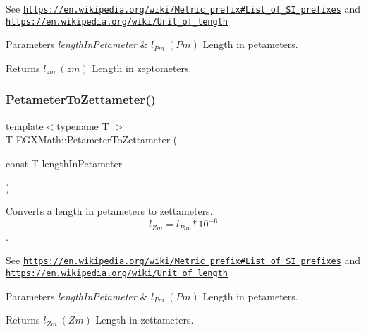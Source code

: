 See \href{https://en.wikipedia.org/wiki/Metric_prefix#List_of_SI_prefixes}{\tt https\+://en.\+wikipedia.\+org/wiki/\+Metric\+\_\+prefix\#\+List\+\_\+of\+\_\+\+S\+I\+\_\+prefixes} and \href{https://en.wikipedia.org/wiki/Unit_of_length}{\tt https\+://en.\+wikipedia.\+org/wiki/\+Unit\+\_\+of\+\_\+length} 
\begin{DoxyParams}{Parameters}
{\em length\+In\+Petameter} & $ l_{Pm}\ (Pm)$ Length in petameters. \\
\hline
\end{DoxyParams}
\begin{DoxyReturn}{Returns}
$ l_{zm}\ (zm)$ Length in zeptometers. 
\end{DoxyReturn}
\mbox{\label{group___e_g_x_math-_conversions-_length_conversions-_petameter-_s_i_gabea28636f814fa1d8a3ce9590478e3e4}} 
\subsubsection{\texorpdfstring{Petameter\+To\+Zettameter()}{PetameterToZettameter()}}
{\footnotesize\ttfamily template$<$typename T $>$ \\
T E\+G\+X\+Math\+::\+Petameter\+To\+Zettameter (\begin{DoxyParamCaption}\item[{const T}]{length\+In\+Petameter }\end{DoxyParamCaption})}



Converts a length in petameters to zettameters. \[ l_{Zm}=l_{Pm} * 10^{-6} \]. 

See \href{https://en.wikipedia.org/wiki/Metric_prefix#List_of_SI_prefixes}{\tt https\+://en.\+wikipedia.\+org/wiki/\+Metric\+\_\+prefix\#\+List\+\_\+of\+\_\+\+S\+I\+\_\+prefixes} and \href{https://en.wikipedia.org/wiki/Unit_of_length}{\tt https\+://en.\+wikipedia.\+org/wiki/\+Unit\+\_\+of\+\_\+length} 
\begin{DoxyParams}{Parameters}
{\em length\+In\+Petameter} & $ l_{Pm}\ (Pm)$ Length in petameters. \\
\hline
\end{DoxyParams}
\begin{DoxyReturn}{Returns}
$ l_{Zm}\ (Zm)$ Length in zettameters. 
\end{DoxyReturn}

